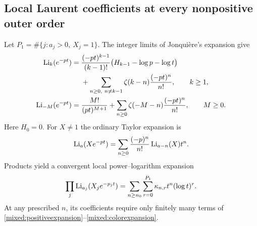 \subsection{Local Laurent coefficients at every nonpositive outer order}

Let $P_1=\#\{j:a_j>0,\ X_j=1\}$. The integer limits of
Jonqui\`ere's expansion \cite[Eq. 25.12.12]{DLMFPolylog} give
\begin{align}\label{mixed:positiveexpansion}
 \operatorname{Li}_k(e^{-pt})
 ={}&\frac{(-pt)^{k-1}}{(k-1)!}
          \bigl(H_{k-1}-\log p-\log t\bigr)\notag\\
 &+\sum_{n\ge0,\ n\ne k-1}\zeta(k-n)\frac{(-pt)^n}{n!},
       \qquad k\ge1,\\
 \operatorname{Li}_{-M}(e^{-pt})
 ={}&\frac{M!}{(pt)^{M+1}}
          +\sum_{n\ge0}\zeta(-M-n)\frac{(-pt)^n}{n!},
       \qquad M\ge0.\label{mixed:negativeexpansion}
\end{align}
Here $H_0=0$. For $X\ne1$ the ordinary Taylor expansion is
\begin{equation}\label{mixed:colorexpansion}
 \operatorname{Li}_a(Xe^{-pt})=
       \sum_{n\ge0}\frac{(-p)^n}{n!}\operatorname{Li}_{a-n}(X)t^n.
\end{equation}
Products yield a convergent local power--logarithm expansion
\begin{equation}\label{mixed:local}
 \prod_j\operatorname{Li}_{a_j}(X_je^{-p_jt})
       =\sum_{n\ge n_0}\sum_{r=0}^{P_1}
                                  \kappa_{n,r}t^n(\log t)^r.
\end{equation}
At any prescribed $n$, its coefficients require only finitely many
terms of \eqref{mixed:positiveexpansion}--\eqref{mixed:colorexpansion}.

